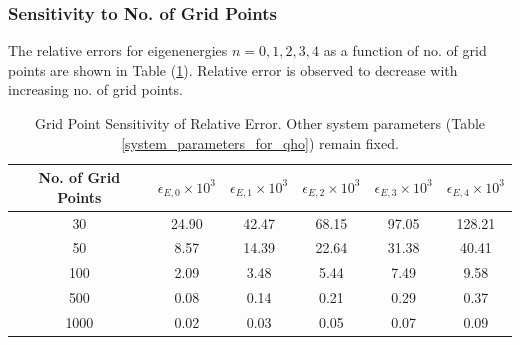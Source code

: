 \subsubsection{Sensitivity to No. of Grid Points}
%
The relative errors for eigenenergies $n=0,1,2,3,4$ as a function of no. of grid points are shown in Table (\ref{grid_point_sensitivity_of_relative_error}). Relative error is observed to decrease with increasing no. of grid points.
\begin{table}[h]
\begin{center}
\begin{tabular}{|c|c|c|c|c|c|}
    \hline
    No. of Grid Points	&	$\epsilon_{E,0}\times 10^{3}$	&	$\epsilon_{E,1}\times 10^{3}$	&	$\epsilon_{E,2}\times 10^{3}$	&	$\epsilon_{E,3}\times 10^{3}$	&	$\epsilon_{E,4}\times 10^{3}$ \\ \hline
	30	&	24.90	&	42.47	&	68.15	&	97.05	&	128.21 \\ \hline
	50	&	8.57	&	14.39	&	22.64	&	31.38	&	40.41 \\ \hline
	100	&	2.09	&	3.48	&	5.44	&	7.49	&	9.58 \\ \hline
	500	&	0.08	&	0.14	&	0.21	&	0.29	&	0.37 \\ \hline
	1000	&	0.02	&	0.03	&	0.05	&	0.07	&	0.09 \\ \hline
\end{tabular}
\end{center}
\caption{Grid Point Sensitivity of Relative Error. Other system parameters (Table \ref{system_parameters_for_qho}) remain fixed.}
\label{grid_point_sensitivity_of_relative_error}
\end{table}

